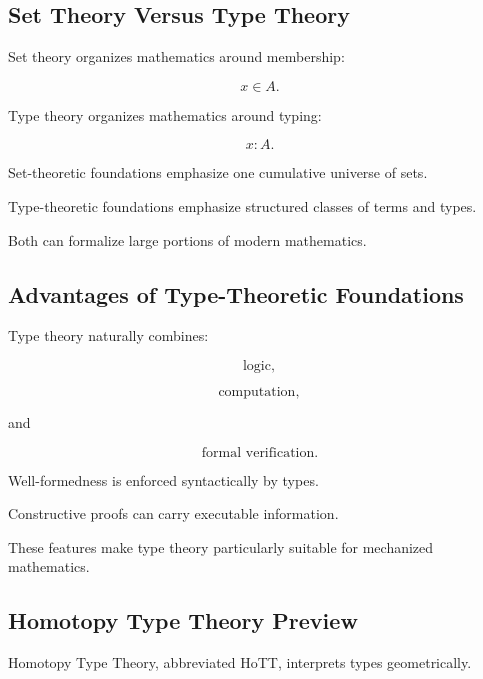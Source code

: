 \subsection{Set Theory Versus Type Theory}
\label{subsec:set-theory-vs-type-theory}

Set theory organizes mathematics around membership:

\[
\boxed{
x\in A.
}
\]

Type theory organizes mathematics around typing:

\[
\boxed{
x:A.
}
\]

Set-theoretic foundations emphasize one cumulative universe of sets.

Type-theoretic foundations emphasize structured classes of terms and types.

Both can formalize large portions of modern mathematics.

\subsection{Advantages of Type-Theoretic Foundations}
\label{subsec:type-theory-foundational-advantages}

Type theory naturally combines:

\[
\boxed{
\text{logic},
}
\]

\[
\boxed{
\text{computation},
}
\]

and

\[
\boxed{
\text{formal verification}.
}
\]

Well-formedness is enforced syntactically by types.

Constructive proofs can carry executable information.

These features make type theory particularly suitable for mechanized
mathematics.

\subsection{Homotopy Type Theory Preview}
\label{subsec:homotopy-type-theory-preview}

Homotopy Type Theory, abbreviated HoTT, interprets types geometrically.

